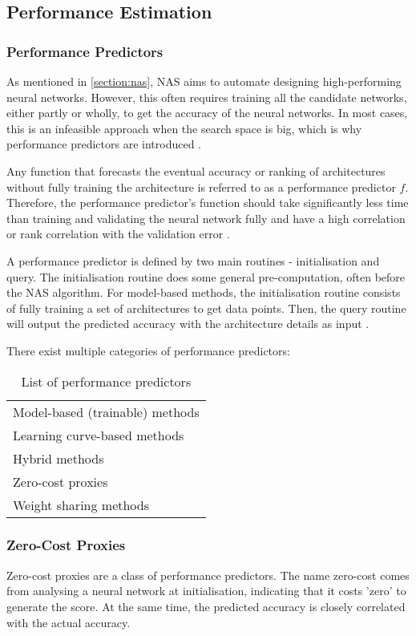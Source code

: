 \subsection{Performance Estimation}
\subsubsection{Performance Predictors}\label{sec:performancepredictors}
As mentioned in \cref{section:nas}, \gls{NAS} aims to automate designing high-performing neural networks. However, this often requires training all the candidate networks, either partly or wholly, to get the accuracy of the neural networks. In most cases, this is an infeasible approach when the search space is big, which is why performance predictors are introduced \autocite{akhauri2022evolving}. 

Any function that forecasts the eventual accuracy or ranking of architectures without fully training the architecture is referred to as a performance predictor $f$. Therefore, the performance predictor's function should take significantly less time than training and validating the neural network fully and have a high correlation or rank correlation with the validation error \autocite{white2021powerful}. 

A performance predictor is defined by two main routines - initialisation and query. The initialisation routine does some general pre-computation, often before the \gls{NAS} algorithm. For model-based methods, the initialisation routine consists of fully training a set of architectures to get data points. Then, the query routine will output the predicted accuracy with the architecture details as input \autocite{white2021powerful}. 

There exist multiple categories of performance predictors:

\begin{table}[h]
\caption{List of performance predictors}
\centering
\begin{tabular}{|l}
Model-based (trainable) methods \\
\cellcolor{verylightgray}Learning curve-based methods    \\
Hybrid methods                  \\
\cellcolor{verylightgray}Zero-cost proxies               \\
Weight sharing methods         
\end{tabular}
\end{table}

\subsubsection{Zero-Cost Proxies}\label{subsec:zerocost}
Zero-cost proxies are a class of performance predictors. The name zero-cost comes from analysing a neural network at initialisation, indicating that it costs 'zero' to generate the score. At the same time, the predicted accuracy is closely correlated with the actual accuracy. 

